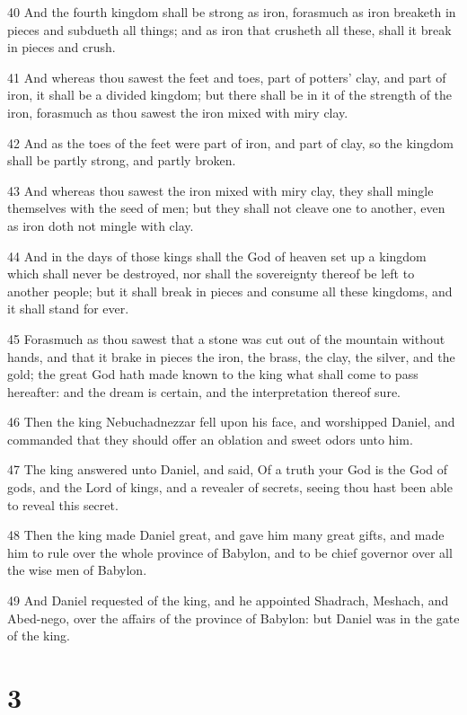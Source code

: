 \par 40 And the fourth kingdom shall be strong as iron, forasmuch as iron breaketh in pieces and subdueth all things; and as iron that crusheth all these, shall it break in pieces and crush.
\par 41 And whereas thou sawest the feet and toes, part of potters' clay, and part of iron, it shall be a divided kingdom; but there shall be in it of the strength of the iron, forasmuch as thou sawest the iron mixed with miry clay.
\par 42 And as the toes of the feet were part of iron, and part of clay, so the kingdom shall be partly strong, and partly broken.
\par 43 And whereas thou sawest the iron mixed with miry clay, they shall mingle themselves with the seed of men; but they shall not cleave one to another, even as iron doth not mingle with clay.
\par 44 And in the days of those kings shall the God of heaven set up a kingdom which shall never be destroyed, nor shall the sovereignty thereof be left to another people; but it shall break in pieces and consume all these kingdoms, and it shall stand for ever.
\par 45 Forasmuch as thou sawest that a stone was cut out of the mountain without hands, and that it brake in pieces the iron, the brass, the clay, the silver, and the gold; the great God hath made known to the king what shall come to pass hereafter: and the dream is certain, and the interpretation thereof sure.
\par 46 Then the king Nebuchadnezzar fell upon his face, and worshipped Daniel, and commanded that they should offer an oblation and sweet odors unto him.
\par 47 The king answered unto Daniel, and said, Of a truth your God is the God of gods, and the Lord of kings, and a revealer of secrets, seeing thou hast been able to reveal this secret.
\par 48 Then the king made Daniel great, and gave him many great gifts, and made him to rule over the whole province of Babylon, and to be chief governor over all the wise men of Babylon.
\par 49 And Daniel requested of the king, and he appointed Shadrach, Meshach, and Abed-nego, over the affairs of the province of Babylon: but Daniel was in the gate of the king.

\chapter{3}

